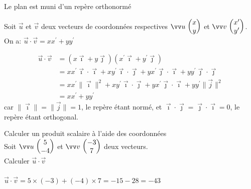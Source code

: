     Le plan est muni d'un repère orthonormé \Rij
    
    \begin{bprop}
        Soit $\vec{u}$ et $\vec{v}$ deux vecteurs de coordonnées respectives $\Coord{u}{x}{y}$ et $\Coord{v}{x'}{y'}$. On a: $\vec{u} \cdot \vec{v}=x x^{\prime}+y y^{\prime}$
    \end{bprop}
    
    \begin{bdemo}
        \begin{align*}
            \vec{u} \cdot \vec{v}&=(x \vec{\imath}+y \vec{\jmath})\left(x^{\prime} \vec{\imath}+y^{\prime} \vec{\jmath}\right)\\
            &=x x^{\prime} \vec{\imath} \cdot \vec{\imath}+x y^{\prime} \vec{\imath} \cdot \vec{\jmath}+y x^{\prime} \vec{\jmath} \cdot \vec{\imath}+y y^{\prime} \vec{\jmath} \cdot \vec{\jmath}\\
            &=x x^{\prime}\|\vec{\imath}\|^{2}+x y^{\prime} \vec{\imath} \cdot \vec{\jmath}+y x^{\prime} \vec{\jmath} \cdot \vec{\imath}+y y^{\prime}\|\vec{j}\|^{2}\\
            &=x x^{\prime}+y y^{\prime}
        \end{align*}
        car $\|\vec{\imath}\|=\|\vec{j}\|=1$, le repère étant normé, et $\vec{\imath} \cdot \vec{\jmath}=\vec{\jmath} \cdot \vec{\imath}=0$, le repère étant orthogonal.
    \end{bdemo}
    
    \begin{bmethodet}{Calculer un produit scalaire à l'aide des coordonnées}
        \\
        Soit $\Coord{u}{5}{-4}$ et $\Coord{v}{-3}{7}$ deux vecteurs.\\
        Calculer $\vec{u} \cdot \vec{v}$
        \ \\
        \\
        $\vec{u} \cdot \vec{v}=5 \times(-3)+(-4) \times 7=-15-28=-43$
    \end{bmethodet}


